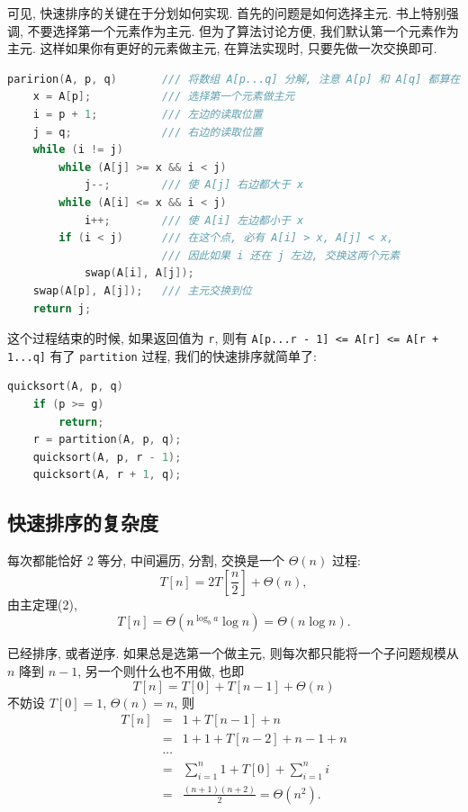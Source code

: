 \documentclass[a4paper]{ctexart}
\theoremstyle{definition}
\theoremstyle{definition}
\begin{document}
可见, 快速排序的关键在于分划如何实现. 首先的问题是如何选择主元.
书上特别强调, 不要选择第一个元素作为主元. 但为了算法讨论方便,
我们默认第一个元素作为主元. 这样如果你有更好的元素做主元,
在算法实现时, 只要先做一次交换即可.


\begin{lstlisting}[language=C++]
paririon(A, p, q)       /// 将数组 A[p...q] 分解, 注意 A[p] 和 A[q] 都算在内.
    x = A[p];           /// 选择第一个元素做主元
	i = p + 1;          /// 左边的读取位置 
	j = q;              /// 右边的读取位置
	while (i != j)
		while (A[j] >= x && i < j)
			j--;        /// 使 A[j] 右边都大于 x
		while (A[i] <= x && i < j)
			i++;        /// 使 A[i] 左边都小于 x
		if (i < j)      /// 在这个点, 必有 A[i] > x, A[j] < x,
	                    /// 因此如果 i 还在 j 左边, 交换这两个元素
            swap(A[i], A[j]);
	swap(A[p], A[j]);   /// 主元交换到位
	return j;
\end{lstlisting}

这个过程结束的时候, 如果返回值为 \verb|r|, 则有\newline 
\verb|A[p...r - 1] <= A[r] <= A[r + 1...q]|\newline
有了 \verb|partition| 过程, 我们的快速排序就简单了:

\begin{lstlisting}[language=C++]
quicksort(A, p, q)
	if (p >= g)
		return;
	r = partition(A, p, q);
	quicksort(A, p, r - 1);
	quicksort(A, r + 1, q);
\end{lstlisting}

\subsection{快速排序的复杂度}

 每次都能恰好 2 等分, 中间遍历, 分割,
交换是一个 $\Theta(n)$ 过程: 
$$ 
T[n] = 2T[\frac{n}{2}] + \Theta(n), 
$$
由主定理(2), 
$$ 
T[n] = \Theta(n^{\log_ba}\log n) = \Theta(n\log n).  
$$

 已经排序, 或者逆序. 如果总是选第一个做主元,
则每次都只能将一个子问题规模从 $n$ 降到 $n - 1$, 另一个则什么也不用做,
也即
$$
T[n] = T[0] + T[n - 1] + \Theta(n)
$$
不妨设 $T[0] = 1$, $\Theta(n) = n$, 则
$$
\begin{array}{rcl}
T[n] &=& 1 + T[n - 1] + n \\
&=& 1 + 1 + T[n - 2] + n - 1 + n \\
&\cdots&\\
&=& \sum_{i = 1}^{n} 1 + T[0] + \sum_{i = 1}^n i \\
&=& \frac{(n + 1)(n + 2)}{2} = \Theta(n^2).
\end{array}
$$
\end{document}
